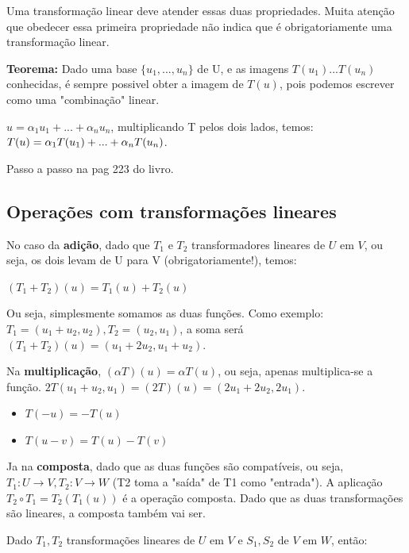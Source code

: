\documentclass[letterpaper, 11pt]{article}
\begin{document}
Uma transformação linear deve atender essas duas propriedades. Muita atenção que obedecer essa primeira propriedade não indica que é obrigatoriamente uma transformação linear.

\textbf{Teorema:} Dado uma base \(\{u_1, ... , u_n\}\) de U, e as imagens \(T(u_1)...T(u_n)\) conhecidas, é sempre possivel obter a imagem de \(T(u)\), pois podemos escrever como uma "combinação" linear.

\begin{center} $u = \alpha_1u_1 + ... + \alpha_nu_n$, multiplicando T pelos dois lados, temos: $\\ T(u) = \alpha_1T(u_1) + ... + \alpha_nT(u_n)$. \end{center}

Passo a passo na pag 223 do livro.

\subsection{Operações com transformações lineares}
\label{sec:orgf6da85e}
No caso da \textbf{adição}, dado que \(T_1\) e \(T_2\) transformadores lineares de \(U\) em \(V\), ou seja, os dois levam de U para V (obrigatoriamente!), temos:

\begin{center} $(T_1 + T_2)(u) = T_1(u) + T_2(u)$ \end{center}

Ou seja, simplesmente somamos as duas funções. Como exemplo: \(T_1 = (u_1 + u_2, u_2), T_2 = (u_2, u_1)\), a soma será \((T_1 + T_2)(u) = (u_1 + 2u_2, u_1 + u_2)\).

Na \textbf{multiplicação}, \((\alpha T)(u) = \alpha T(u)\), ou seja, apenas multiplica-se a função. \(2T(u_1+u_2,u_1) = (2T)(u) = (2u_1 + 2u_2, 2u_1)\).

\begin{itemize}
\item \(T(-u) = -T(u)\)
\item \(T(u-v) = T(u)  - T(v)\)
\end{itemize}

Ja na \textbf{composta}, dado que as duas funções são compatíveis, ou seja, \(T_1 : U \to V, T_2: V \to W\) (T2 toma a "saída" de T1 como "entrada"). A aplicação \(T_2 \circ T_1 = T_2(T_1(u))\) é a operação composta. Dado que as duas
transformações são lineares, a composta também vai ser.

Dado \(T_1, T_2\) transformações lineares de \(U\) em \(V\) e \(S_1,S_2\) de \(V\) em \(W\), então:
\end{document}
